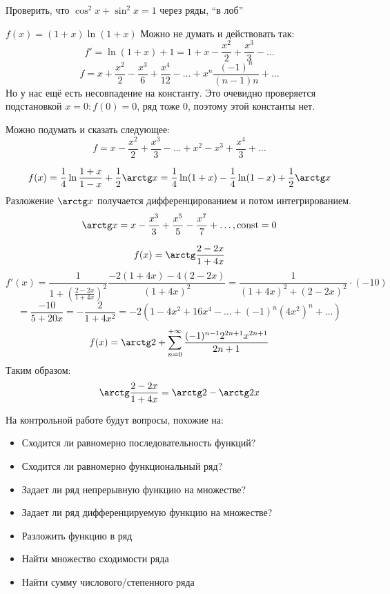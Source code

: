 \begin{exercise}
    Проверить, что \(\cos^2 x + \sin^2 x = 1\) через ряды, ``в лоб''
\end{exercise}

\begin{exercise}[2873]
    \(f(x) = (1 + x)\ln(1 + x)\)
    Можно не думать и действовать так:
    \[f' = \ln(1 + x) + 1 = 1 + x - \frac{x^2}{2} + \frac{x^3}{3} - \dots \]
    \[f = x + \frac{x^2}{2} - \frac{x^3}{6} + \frac{x^4}{12} - \dots + x^n \frac{( - 1)^n}{(n - 1)n} + \dots \]
    Но у нас ещё есть несовпадение на константу. Это очевидно проверяется подстановкой \(x = 0 : f(0) = 0\), ряд тоже \(0\), поэтому этой константы нет.

    Можно подумать и сказать следующее:
    \[f = x - \frac{x^2}{2} + \frac{x^3}{3} - \dots + x^2 - x^3 + \frac{x^4}{3} + \dots \]
\end{exercise}

\begin{exercise}
    \[f(x) = \frac{1}{4}\ln \frac{1 + x}{1 - x} + \frac{1}{2}\arctg x = \frac{1}{4}\ln(1 + x) - \frac{1}{4}\ln(1 - x) + \frac{1}{2}\arctg x\]
    Разложение \(\arctg x\) получается дифференцированием и потом интегрированием.
    \[\arctg x = x - \frac{x^3}{3} + \frac{x^5}{5} - \frac{x^7}{7} + \dots , \const = 0\]
\end{exercise}

\begin{exercise}
    \[f(x) = \arctg \frac{2 - 2x}{1 + 4x} \]
    \[f'(x) = \frac{1}{1 + \left( \frac{2 - 2x}{1 + 4x}  \right)^2} \frac{ - 2(1 + 4x) - 4(2 - 2x)}{(1 + 4x)^2} = \frac{1}{(1 + 4x)^2 + (2 - 2x)^2} \cdot ( - 10)\]
    \[ = \frac{ -10}{5 + 20x} =- \frac{2}{1 + 4x^2} = - 2(1 - 4x^2 + 16x^4 - \dots + ( - 1)^n (4x^2)^n + \dots )\]
    \[f(x) = \arctg 2 + \sum_{n = 0}^{+\infty} \frac{( - 1)^{n - 1} 2^{2n + 1} x^{2n + 1}}{2n + 1} \]
    Таким образом:
    \[\arctg \frac{2 - 2x}{1 + 4x} = \arctg 2 - \arctg 2x\]
\end{exercise}

На контрольной работе будут вопросы, похожие на:
\begin{itemize}
    \item Сходится ли равномерно последовательность функций?
    \item Сходится ли равномерно функциональный ряд?
    \item Задает ли ряд непрерывную функцию на множестве?
    \item Задает ли ряд дифференцируемую функцию на множестве?
    \item Разложить функцию в ряд
    \item Найти множество сходимости ряда
    \item Найти сумму числового/степенного ряда
\end{itemize}


